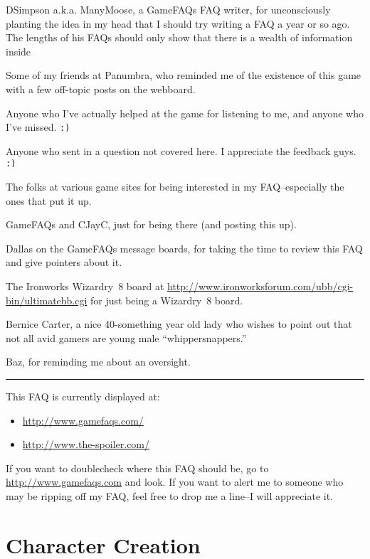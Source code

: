 \documentclass[12pt]{article}
\providecommand{\tightlist}{%
  \setlength{\itemsep}{0pt}\setlength{\parskip}{0pt}}
\begin{document}
DSimpson a.k.a. ManyMoose, a GameFAQs FAQ writer, for unconsciously
planting the idea in my head that I should try writing a FAQ a year or
so ago. The lengths of his FAQs should only show that there is a wealth
of information inside

Some of my friends at Panumbra, who reminded me of the existence of this
game with a few off-topic posts on the webboard.

Anyone who I've actually helped at the game for listening to me, and
anyone who I've missed. \texttt{:)}

Anyone who sent in a question not covered here. I appreciate the
feedback guys. \texttt{:)}

The folks at various game sites for being interested in my
FAQ--especially the ones that put it up.

GameFAQs and CJayC, just for being there (and posting this up).

Dallas on the GameFAQs message boards, for taking the time to review
this FAQ and give pointers about it.

The Ironworks Wizardry~8 board at
\url{http://www.ironworksforum.com/ubb/cgi-bin/ultimatebb.cgi} for just
being a Wizardry~8 board.

Bernice Carter, a nice 40-something year old lady who wishes to point
out that not all avid gamers are young male ``whippersnappers.''

Baz, for reminding me about an oversight.

\begin{center}\rule{0.5\linewidth}{\linethickness}\end{center}

This FAQ is currently displayed at:

\begin{itemize}
\tightlist
\item
  \url{http://www.gamefaqs.com/}
\item
  \url{http://www.the-spoiler.com/}
\end{itemize}

If you want to doublecheck where this FAQ should be, go to
\url{http://www.gamefaqs.com} and look. If you want to alert me to
someone who may be ripping off my FAQ, feel free to drop me a line--I
will appreciate it.

\section{Character Creation}\label{character-creation}
\end{document}
